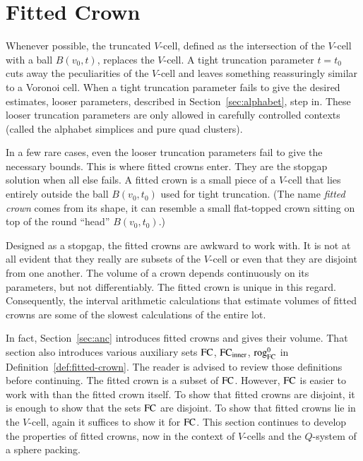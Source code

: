 



\section{Fitted Crown}%
    \label{sec:fine-overview}

Whenever possible, the truncated $V$-cell, defined as the intersection
of the $V$-cell with a ball $B(v_0,t)$,  replaces the 
$V$-cell.  A tight truncation parameter $t=t_0$ cuts away the peculiarities
of the $V$-cell and leaves something reassuringly similar to a Voronoi cell.
When a tight truncation parameter fails to give the desired estimates,
looser parameters, described in Section~\ref{sec:alphabet}, step in.  
These looser truncation parameters are only allowed in carefully controlled contexts (called the alphabet simplices and pure quad clusters).

In a few rare cases, even the looser truncation parameters fail to give the necessary bounds.  This is where fitted crowns enter.  They are the stopgap 
solution when all else fails.    A fitted crown is a small piece of a $V$-cell
that lies entirely outside the ball $B(v_0,t_0)$ used for tight truncation.
(The name {\it fitted crown} comes from its shape, it can resemble a small
flat-topped crown sitting on top of the round ``head'' $B(v_0,t_0)$.)

Designed as a stopgap, the fitted crowns are awkward to work with.
It is not at all evident that they really are subsets of the $V$-cell or even
that they are disjoint from one another.  The volume of a crown depends
continuously on its parameters, but not differentiably.  The fitted crown
is unique in this regard.
Consequently, the interval arithmetic calculations that estimate volumes
of fitted crowns are some of the slowest calculations of the entire lot.

In fact, 
Section~\ref{sec:anc} introduces fitted crowns and gives their volume. 
That section also introduces  
various auxiliary sets ${\operatorname{FC}}$, ${\operatorname{FC}}_{\text{inner}}$, ${\operatorname{rog}}^0_{\text{FC}}$ in
Definition~\ref{def:fitted-crown}.  The reader is advised to review those
definitions before continuing.  The fitted crown is a subset of ${\operatorname{FC}}$.
However, ${\operatorname{FC}}$ is easier to work with than the fitted crown itself.  
To show that fitted crowns are disjoint, it is enough to show that
the sets ${\operatorname{FC}}$ are disjoint.  To show that fitted crowns lie in the $V$-cell,
again it suffices to show it for ${\operatorname{FC}}$.  
This section continues to develop the
properties of fitted crowns, now
in the context of $V$-cells and the $Q$-system
of a sphere packing.  



